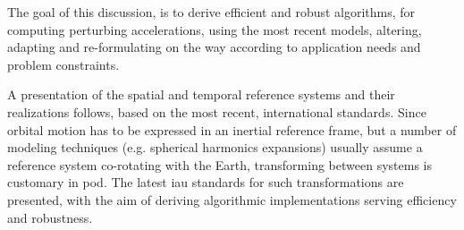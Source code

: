 The goal of this discussion, is to derive efficient and robust algorithms, for computing 
perturbing accelerations, using the most recent models, altering, adapting and re-formulating 
on the way according to application needs and problem constraints.

A presentation of the spatial and temporal reference systems and their realizations follows, 
based on the most recent, international standards. Since orbital motion has to be 
expressed in an inertial reference frame, but a number of modeling techniques (e.g. 
spherical harmonics expansions) usually assume a reference system co-rotating with 
the Earth, transforming between systems is customary in \gls{pod}. The latest 
\gls{iau} standards for such transformations are presented, with the aim of deriving 
algorithmic implementations serving efficiency and robustness.
